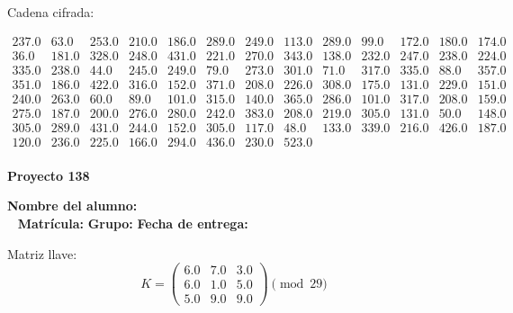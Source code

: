\documentclass[12pt]{article}
\begin{document}
Cadena cifrada:
\begin{center}
$\begin{array}{lllllllllllll}
237.0 & 63.0 & 253.0 & 210.0 & 186.0 & 289.0 & 249.0 & 113.0 & 289.0 & 99.0 & 172.0 & 180.0 & 174.0\\
36.0 & 181.0 & 328.0 & 248.0 & 431.0 & 221.0 & 270.0 & 343.0 & 138.0 & 232.0 & 247.0 & 238.0 & 224.0\\
335.0 & 238.0 & 44.0 & 245.0 & 249.0 & 79.0 & 273.0 & 301.0 & 71.0 & 317.0 & 335.0 & 88.0 & 357.0\\
351.0 & 186.0 & 422.0 & 316.0 & 152.0 & 371.0 & 208.0 & 226.0 & 308.0 & 175.0 & 131.0 & 229.0 & 151.0\\
240.0 & 263.0 & 60.0 & 89.0 & 101.0 & 315.0 & 140.0 & 365.0 & 286.0 & 101.0 & 317.0 & 208.0 & 159.0\\
275.0 & 187.0 & 200.0 & 276.0 & 280.0 & 242.0 & 383.0 & 208.0 & 219.0 & 305.0 & 131.0 & 50.0 & 148.0\\
305.0 & 289.0 & 431.0 & 244.0 & 152.0 & 305.0 & 117.0 & 48.0 & 133.0 & 339.0 & 216.0 & 426.0 & 187.0\\
120.0 & 236.0 & 225.0 & 166.0 & 294.0 & 436.0 & 230.0 & 523.0\\
\end{array}$
\end{center}

\newpage


\textbf{Proyecto 138}

\textbf{Nombre del alumno:} \underline{\hspace{13cm}}\\\
\vspace{1cm}
\textbf{Matrícula:} \underline{\hspace{4cm}} \hspace{1cm}
\textbf{Grupo:} \underline{\hspace{2cm}}
\textbf{Fecha de entrega:} \underline{\hspace{2cm}}

\medskip

Matriz llave:
\[
K = \begin{pmatrix}
6.0 & 7.0 & 3.0\\
6.0 & 1.0 & 5.0\\
5.0 & 9.0 & 9.0
\end{pmatrix} \pmod{29}
\]
\end{document}
